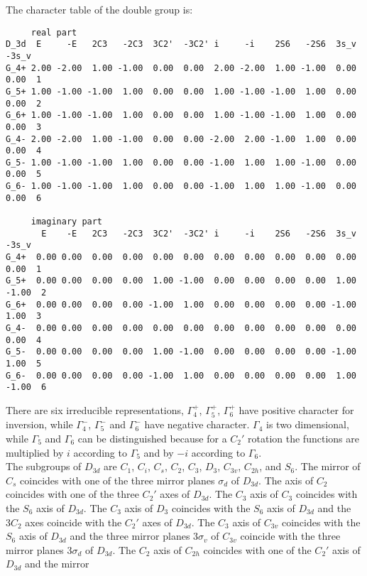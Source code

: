 \documentclass[12pt,a4paper]{article}
\begin{document}
The character table of the double group is:
\begin{footnotesize}
\begin{verbatim}
     real part
D_3d  E     -E   2C3   -2C3  3C2'  -3C2' i     -i    2S6   -2S6  3s_v  -3s_v
G_4+ 2.00 -2.00  1.00 -1.00  0.00  0.00  2.00 -2.00  1.00 -1.00  0.00  0.00  1
G_5+ 1.00 -1.00 -1.00  1.00  0.00  0.00  1.00 -1.00 -1.00  1.00  0.00  0.00  2
G_6+ 1.00 -1.00 -1.00  1.00  0.00  0.00  1.00 -1.00 -1.00  1.00  0.00  0.00  3
G_4- 2.00 -2.00  1.00 -1.00  0.00  0.00 -2.00  2.00 -1.00  1.00  0.00  0.00  4 
G_5- 1.00 -1.00 -1.00  1.00  0.00  0.00 -1.00  1.00  1.00 -1.00  0.00  0.00  5
G_6- 1.00 -1.00 -1.00  1.00  0.00  0.00 -1.00  1.00  1.00 -1.00  0.00  0.00  6

     imaginary part
       E    -E   2C3   -2C3  3C2'  -3C2' i     -i    2S6   -2S6  3s_v  -3s_v
G_4+  0.00 0.00  0.00  0.00  0.00  0.00  0.00  0.00  0.00  0.00  0.00  0.00  1
G_5+  0.00 0.00  0.00  0.00  1.00 -1.00  0.00  0.00  0.00  0.00  1.00 -1.00  2
G_6+  0.00 0.00  0.00  0.00 -1.00  1.00  0.00  0.00  0.00  0.00 -1.00  1.00  3
G_4-  0.00 0.00  0.00  0.00  0.00  0.00  0.00  0.00  0.00  0.00  0.00  0.00  4
G_5-  0.00 0.00  0.00  0.00  1.00 -1.00  0.00  0.00  0.00  0.00 -1.00  1.00  5
G_6-  0.00 0.00  0.00  0.00 -1.00  1.00  0.00  0.00  0.00  0.00  1.00 -1.00  6
\end{verbatim}
\end{footnotesize}
There are six irreducible representations, $\Gamma_4^+$, $\Gamma_5^+$,
$\Gamma_6^+$ have positive character for inversion, while $\Gamma_4^-$, 
$\Gamma_5^-$ and $\Gamma_6^-$ have negative character. $\Gamma_4$ is two 
dimensional, while $\Gamma_5$ and $\Gamma_6$ can be distinguished because 
for a $C_2'$ rotation the functions are multiplied by $i$ according to 
$\Gamma_5$ and by $-i$ according to $\Gamma_6$. \\
The subgroups of $D_{3d}$ are $C_1$, $C_i$, $C_s$, $C_2$, $C_3$, $D_3$, 
$C_{3v}$, $C_{2h}$, and $S_6$. The mirror of $C_s$ coincides with one
of the three mirror planes $\sigma_d$ of $D_{3d}$. The axis of $C_2$
coincides with one of the three $C_2'$ axes of $D_{3d}$. 
The $C_3$ axis of $C_3$ coincides with the $S_6$ axis of $D_{3d}$.
The $C_3$ axis of $D_3$ coincides with the $S_6$ axis of $D_{3d}$ and the
$3C_2$ axes coincide with the $C_2'$ axes of $D_{3d}$. The $C_3$ axis
of $C_{3v}$ coincides with the $S_6$ axis of $D_{3d}$ and the three
mirror planes $3\sigma_v$ of $C_{3v}$ coincide with the three mirror
planes $3\sigma_d$ of $D_{3d}$. The $C_2$ axis of 
$C_{2h}$ coincides with one of the $C_2'$ axis of $D_{3d}$ and the mirror
\end{document}
